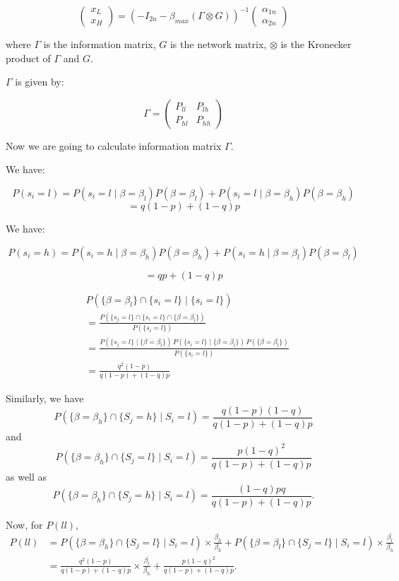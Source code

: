 \documentclass[12pt]{article}
\begin{document}
\[
\begin{pmatrix}
x_L \\
x_H
\end{pmatrix}
= \left( -I_{2n} - \beta_{max} (\Gamma\otimes G) \right)^{-1}
\begin{pmatrix}
\alpha_{1n} \\
\alpha_{2n}
\end{pmatrix}
\]

where $\Gamma$ is the information matrix, $G$ is the network matrix, $\otimes$ is the Kronecker product of $\Gamma$ and $G$.

$\Gamma$ is given by:

\[
\Gamma = 
\begin{pmatrix}
P_{ll} & P_{lh} \\
P_{hl} & P_{hh}
\end{pmatrix}
\]

Now we are going to calculate information matrix $\Gamma$.

We have:

\[
P(s_i = l) = P(s_i = l \mid \beta = \beta_l)P(\beta = \beta_l) + P(s_i = l \mid \beta = \beta_h) P(\beta = \beta_h)
\]
\[
=q(1-p)+(1-q)p
\]

We have:

\[
P(s_i = h) = P(s_i = h \mid \beta = \beta_h)P(\beta = \beta_h) + P(s_i = h \mid \beta = \beta_l) P(\beta = \beta_l)
\]


\[
= qp+(1-q)p
\]



\begin{align*}
&P(\{ \beta = \beta_l\} \cap \{ s_i= l \} \mid \{ s_i = l \}) \\
&= \frac{P(\{ s_j = l \} \cap \{ s_i = l \} \cap \{ \beta = \beta_l \})}{P(\{ s_i = l \})} \\
&= \frac{P(\{ s_j = l \} \mid \{ \beta = \beta_l \}) \, P(\{ s_i = l \} \mid \{ \beta = \beta_l \}) \, P(\{ \beta = \beta_l\})}{P(\{ s_i = l \})} \\
&= \frac{q^2(1-p)}{q(1-p)+ (1 - q)p}
\end{align*}

Similarly, we have
\[
P(\{\beta = \beta_h\} \cap \{S_j = h\} \mid S_i = l) = \frac{q(1-p)(1-q)}{q(1-p) + (1-q)p}
\]
and
\[
P(\{\beta = \beta_h\} \cap \{S_j = l\} \mid S_i = l) = \frac{p(1-q)^2}{q(1-p) + (1-q)p}
\]
as well as
\[
P(\{\beta = \beta_h\} \cap \{S_j = h\} \mid S_i = l) = \frac{(1-q)pq}{q(1-p) + (1-q)p}.
\]

Now, for \( P(ll) \),
\begin{align*}
P(ll) &= P\left( \{\beta = \beta_h\} \cap \{S_j = l\} \mid S_i = l \right) \times \frac{\beta_h}{\beta_h}
+ P\left( \{\beta = \beta_l\} \cap \{S_j = l\} \mid S_i = l \right) \times \frac{\beta_l}{\beta_h} \\
&= \frac{q^2(1-p)} {q(1-p)+(1-q)p}\times \frac{\beta_l}{\beta_h}
+ \frac{p(1-q)^2}{q(1-p)+(1-q)p}.
\end{align*}
\end{document}
